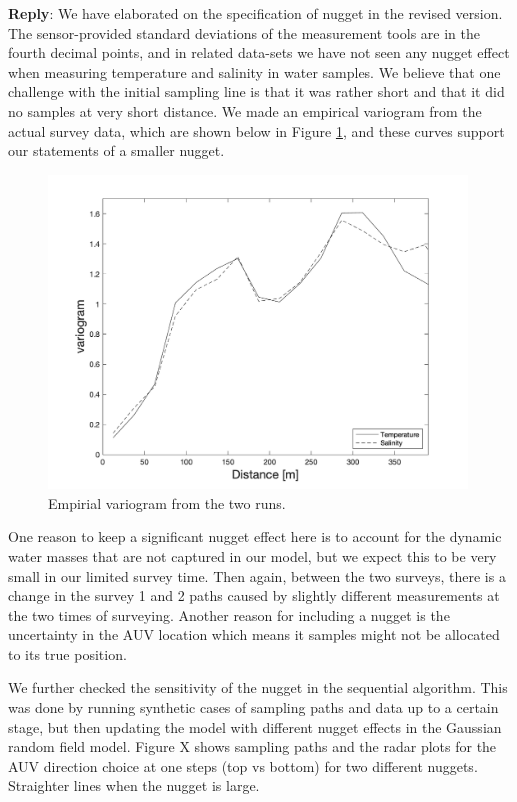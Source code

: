 \documentclass[a4paper]{article}
\def\reply{\textbf{Reply}}
\begin{document}
\vspace{5mm}
\reply: We have elaborated on the specification of nugget in the revised version. The sensor-provided standard deviations of the measurement tools are in the fourth decimal points, and in related data-sets we have not seen any nugget effect when measuring temperature and salinity in water samples. We believe that one challenge with the initial sampling line is that it was rather short and that it did no samples at very short distance. We made an empirical variogram from the actual survey data, which are shown below in Figure \ref{empVar}, and these curves support our statements of a smaller nugget.
\begin{figure}[!b] 
\centering
\includegraphics[width=0.99\textwidth]{Figures/field-trials/empVAR.png}
\caption{Empirial variogram from the two runs. }
\label{empVar}
\end{figure}

One reason to keep a significant nugget effect here is to account for the dynamic water masses that are not captured in our model, but we expect this to be very small in our limited survey time. Then again, between the two surveys, there is a change in the survey 1 and 2 paths caused by slightly different measurements at the two times of surveying. Another reason for including a nugget is the uncertainty in the AUV location which means it samples might not be allocated to its true position.

We further checked the sensitivity of the nugget in the sequential algorithm. This was done by running synthetic cases of sampling paths and data up to a certain stage, but then updating the model with different nugget effects in the Gaussian random field model. Figure X shows sampling paths and the radar plots for the AUV direction choice at one steps (top vs bottom) for two different nuggets. Straighter lines when the nugget is large.
\end{document}
